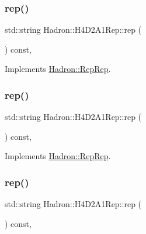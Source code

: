 \subsubsection{\texorpdfstring{rep()}{rep()}\hspace{0.1cm}{\footnotesize\ttfamily [2/5]}}
{\footnotesize\ttfamily std\+::string Hadron\+::\+H4\+D2\+A1\+Rep\+::rep (\begin{DoxyParamCaption}{ }\end{DoxyParamCaption}) const\hspace{0.3cm}{\ttfamily [inline]}, {\ttfamily [virtual]}}



Implements \mbox{\hyperlink{structHadron_1_1RepRep_ab3213025f6de249f7095892109575fde}{Hadron\+::\+Rep\+Rep}}.

\mbox{\label{structHadron_1_1H4D2A1Rep_ad4b2ccfecdb8297fd88eaa27c9d1262e}} 
\subsubsection{\texorpdfstring{rep()}{rep()}\hspace{0.1cm}{\footnotesize\ttfamily [3/5]}}
{\footnotesize\ttfamily std\+::string Hadron\+::\+H4\+D2\+A1\+Rep\+::rep (\begin{DoxyParamCaption}{ }\end{DoxyParamCaption}) const\hspace{0.3cm}{\ttfamily [inline]}, {\ttfamily [virtual]}}



Implements \mbox{\hyperlink{structHadron_1_1RepRep_ab3213025f6de249f7095892109575fde}{Hadron\+::\+Rep\+Rep}}.

\mbox{\label{structHadron_1_1H4D2A1Rep_ad4b2ccfecdb8297fd88eaa27c9d1262e}} 
\subsubsection{\texorpdfstring{rep()}{rep()}\hspace{0.1cm}{\footnotesize\ttfamily [4/5]}}
{\footnotesize\ttfamily std\+::string Hadron\+::\+H4\+D2\+A1\+Rep\+::rep (\begin{DoxyParamCaption}{ }\end{DoxyParamCaption}) const\hspace{0.3cm}{\ttfamily [inline]}, {\ttfamily [virtual]}}



